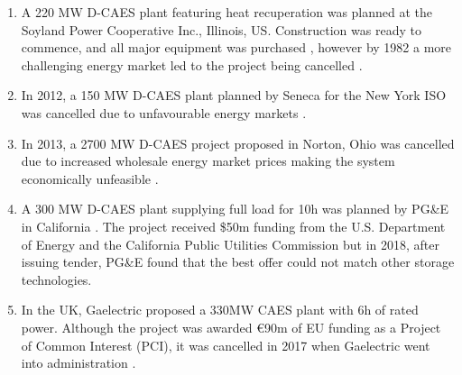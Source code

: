 \documentclass[preprint,12pt]{elsarticle}
\begin{document}
\begin{enumerate}
    \item A 220 MW D-CAES plant featuring heat recuperation was planned at the Soyland Power Cooperative Inc., Illinois, US. Construction was ready to commence, and all major equipment was purchased \cite{Linden2007}, however by 1982 a more challenging energy market led to the project being cancelled \cite{Soyland1982}.
    \item	In 2012, a 150 MW D-CAES plant planned by Seneca for the New York ISO was cancelled due to unfavourable energy markets \cite{Rettberg2012}.
    \item 	In 2013, a 2700 MW D-CAES project proposed in Norton, Ohio was cancelled due to increased wholesale energy market prices making the system  economically unfeasible \cite{Budt2016}.
	\item A 300 MW D-CAES plant supplying full load for 10h was planned by PG\&E in California \cite{DOE2014}. The project received \$50m funding from the U.S. Department of Energy and the California Public Utilities Commission but in 2018, after issuing tender, PG\&E found that the best offer could not match other storage technologies. 
	\item	In the UK, Gaelectric proposed a 330MW CAES plant with 6h of rated power. Although the project was awarded €90m of EU funding as a Project of Common Interest (PCI), it was cancelled in 2017 when Gaelectric went into administration \cite{King2021}. 
    
\end{enumerate}
\end{document}
